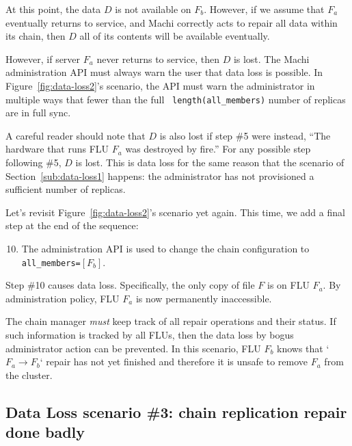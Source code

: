 \documentclass[preprint,10pt]{sigplanconf}
\begin{document}
At this point, the data $D$ is not available on $F_b$.  However, if
we assume that $F_a$ eventually returns to service, and Machi
correctly acts to repair all data within its chain, then $D$
all of its contents will be available eventually.

However, if server $F_a$ never returns to service, then $D$ is lost.  The
Machi administration API must always warn the user that data loss is
possible.  In Figure~\ref{fig:data-loss2}'s scenario, the API must
warn the administrator in multiple ways that fewer than the full {\tt
  length(all\_members)} number of replicas are in full sync.

A careful reader should note that $D$ is also lost if step \#5 were
instead, ``The hardware that runs FLU $F_a$ was destroyed by fire.''
For any possible step following \#5, $D$ is lost.  This is data loss
for the same reason that the scenario of Section~\ref{sub:data-loss1}
happens: the administrator has not provisioned a sufficient number of
replicas.

Let's revisit Figure~\ref{fig:data-loss2}'s scenario yet again.  This
time, we add a final step at the end of the sequence:

\begin{enumerate}
\setcounter{enumi}{9}           %
\item The administration API is used to change the chain
configuration to {\tt all\_members=$[F_b]$}.
\end{enumerate}

Step \#10 causes data loss.  Specifically, the only copy of file
$F$ is on FLU $F_a$.  By administration policy, FLU $F_a$ is now
permanently inaccessible.

The chain manager {\em must} keep track of all
repair operations and their status.  If such information is tracked by
all FLUs, then the data loss by bogus administrator action can be
prevented.  In this scenario, FLU $F_b$ knows that `$F_a \rightarrow
F_b$` repair has not yet finished and therefore it is unsafe to remove
$F_a$ from the cluster.

\subsection{Data Loss scenario \#3: chain replication repair done badly}
\label{sub:data-loss3}
\end{document}
